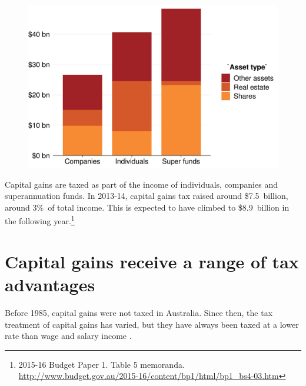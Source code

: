 \documentclass{grattan}\usepackage[]{graphicx}\usepackage[]{color}
\begin{document}
\begin{figure}
\includegraphics[width=\columnwidth]{CGT-NG-atlas//CGT-by-entity-asset-1}
\end{figure}

Capital gains are taxed as part of the income of individuals, companies and superannuation funds. In 2013-14, capital gains tax raised around \$7.5~billion, around 3\%\ of total income. This is expected to have climbed to \$8.9~billion in the following year.\footnote{2015-16 Budget Paper 1. Table 5 memoranda. \url{http://www.budget.gov.au/2015-16/content/bp1/html/bp1_bs4-03.htm}}

\section{Capital gains receive a range of tax advantages}
Before 1985, capital gains were not taxed in Australia. Since then, the tax treatment of capital gains has varied, but they have always been taxed at a lower rate than wage and salary income . 
\end{document}
